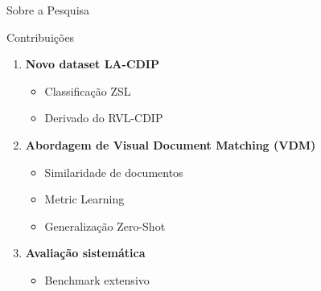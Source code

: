 \begin{frame}{Sobre a Pesquisa}
\begin{block}{Contribuições}
    \begin{enumerate}
        \item \textbf{Novo dataset LA-CDIP}
        \begin{itemize}
            \item Classificação ZSL
            \item Derivado do RVL-CDIP
        \end{itemize}
        
        \item \textbf{Abordagem de Visual Document Matching (VDM)}
        \begin{itemize}
            \item Similaridade de documentos
            \item Metric Learning
            \item Generalização Zero-Shot
        \end{itemize}
        
        \item \textbf{Avaliação sistemática}
        \begin{itemize}
            \item Benchmark extensivo
        \end{itemize}
    \end{enumerate}
\end{block}
\end{frame}
